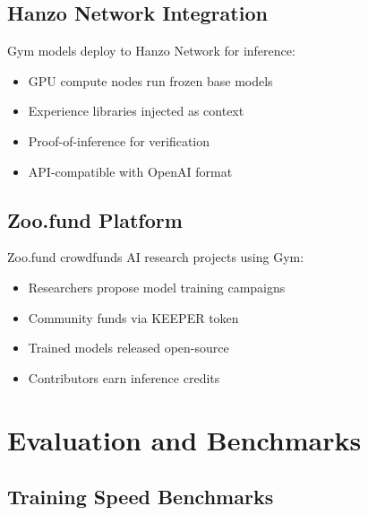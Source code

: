 \documentclass[11pt,letterpaper]{article}
\begin{document}
\subsection{Hanzo Network Integration}

Gym models deploy to Hanzo Network for inference:
\begin{itemize}
\item GPU compute nodes run frozen base models
\item Experience libraries injected as context
\item Proof-of-inference for verification
\item API-compatible with OpenAI format
\end{itemize}

\subsection{Zoo.fund Platform}

Zoo.fund crowdfunds AI research projects using Gym:
\begin{itemize}
\item Researchers propose model training campaigns
\item Community funds via KEEPER token
\item Trained models released open-source
\item Contributors earn inference credits
\end{itemize}

\section{Evaluation and Benchmarks}

\subsection{Training Speed Benchmarks}
\end{document}
